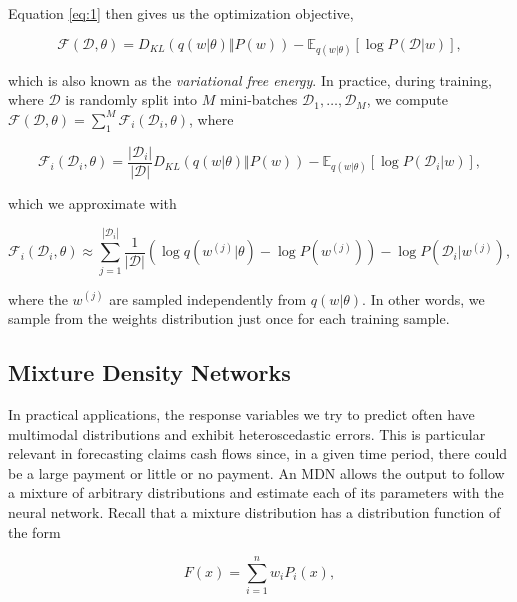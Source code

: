 \documentclass{article}
\begin{document}
Equation \ref{eq:1} then gives us the optimization objective,

\begin{equation}
    \mathcal{F}(\mathcal{D}, \theta) = D_{KL}(q(w|\theta) \Vert P(w)) - \mathbb{E}_{q(w|\theta)}[\log P(\mathcal{D}|w)],
\end{equation}

which is also known as the \textit{variational free energy}. In practice, during training, where $\mathcal{D}$ is randomly split into $M$ mini-batches $\mathcal{D}_1,\dots,\mathcal{D}_M$, we compute $\mathcal{F}(\mathcal{D}, \theta) = \sum_1^M \mathcal{F}_i(\mathcal{D}_i, \theta)$, where

\begin{equation}
    \mathcal{F}_i(\mathcal{D}_i, \theta) = \frac{|\mathcal{D}_i|}{|\mathcal{D}|}D_{KL}(q(w|\theta) \Vert P(w)) - \mathbb{E}_{q(w|\theta)}[\log P(\mathcal{D}_i|w)],
\end{equation}

which we approximate with

\begin{equation}
    \mathcal{F}_i(\mathcal{D}_i, \theta) \approx \sum_{j=1}^{|\mathcal{D}_i|} \frac{1}{|\mathcal{D}|} ( \log q(w^{(j)}|\theta) - \log P(w^{(j)}) ) - \log P(\mathcal{D}_i|w^{(j)}),
\end{equation}

where the $w^{(j)}$ are sampled independently from $q(w|\theta)$. In other words, we sample from the weights distribution just once for each training sample.

\subsection{Mixture Density Networks}\label{section:mdn}

In practical applications, the response variables we try to predict often have multimodal distributions and exhibit heteroscedastic errors. This is particular relevant in forecasting claims cash flows since, in a given time period, there could be a large payment or little or no payment. An MDN allows the output to follow a mixture of arbitrary distributions and estimate each of its parameters with the neural network. Recall that a mixture distribution has a distribution function of the form

\begin{equation}
    F(x) = \sum_{i = 1}^n w_i P_i(x),
\end{equation}
\end{document}
